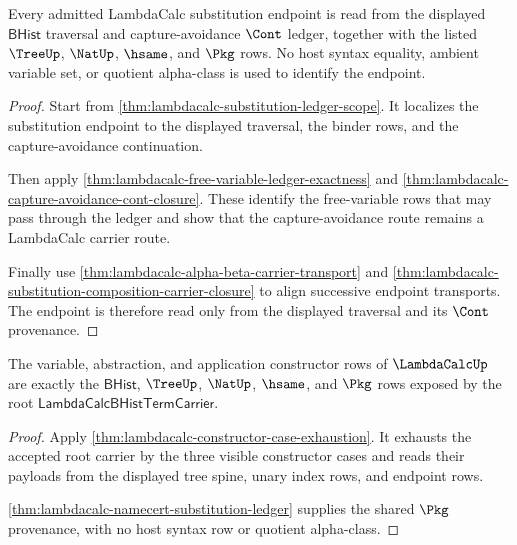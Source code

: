 \begin{theorem}
\label{thm:lambdacalc-namecert-substitution-ledger}
Every admitted LambdaCalc substitution endpoint is read from the displayed
$\mathsf{BHist}$ traversal and capture-avoidance $\Cont$ ledger, together with
the listed $\TreeUp$, $\NatUp$, $\hsame$, and $\Pkg$ rows. No host syntax
equality, ambient variable set, or quotient alpha-class is used to identify
the endpoint.
\end{theorem}
\begin{proof}
Start from
\autoref{thm:lambdacalc-substitution-ledger-scope}. It localizes the
substitution endpoint to the displayed traversal, the binder rows, and the
capture-avoidance continuation.

Then apply
\autoref{thm:lambdacalc-free-variable-ledger-exactness} and
\autoref{thm:lambdacalc-capture-avoidance-cont-closure}. These identify
the free-variable rows that may pass through the ledger and show that the
capture-avoidance route remains a LambdaCalc carrier route.

Finally use
\autoref{thm:lambdacalc-alpha-beta-carrier-transport} and
\autoref{thm:lambdacalc-substitution-composition-carrier-closure} to align
successive endpoint transports. The endpoint is therefore read only from the
displayed traversal and its $\Cont$ provenance.
\end{proof}

\begin{theorem}
\label{thm:lambdacalc-root-constructor-scope}
The variable, abstraction, and application constructor rows of
$\LambdaCalcUp$ are exactly the $\mathsf{BHist}$, $\TreeUp$, $\NatUp$,
$\hsame$, and $\Pkg$ rows exposed by the root
$\mathsf{LambdaCalcBHistTermCarrier}$.
\end{theorem}
\begin{proof}
Apply \autoref{thm:lambdacalc-constructor-case-exhaustion}. It exhausts the
accepted root carrier by the three visible constructor cases and reads their
payloads from the displayed tree spine, unary index rows, and endpoint rows.

\autoref{thm:lambdacalc-namecert-substitution-ledger} supplies the shared
$\Pkg$ provenance, with no host syntax row or quotient alpha-class.
\end{proof}

